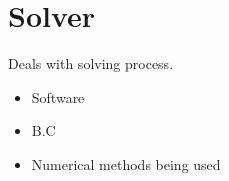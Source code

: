\section{Solver}
Deals with solving process.
\begin{itemize}
 \item Software
 \item B.C
 \item Numerical methods being used
\end{itemize}

